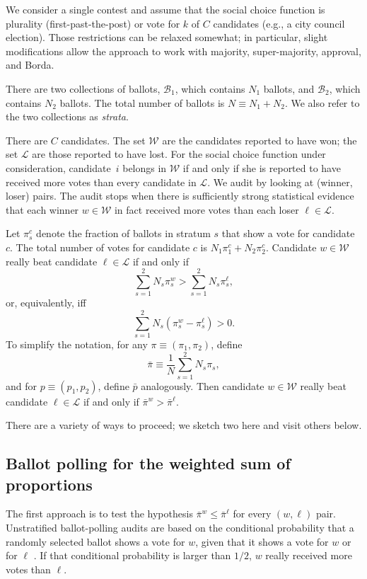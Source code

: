 \documentclass[12pt]{article}
\newcommand{\beq}{\begin{equation}}
\newcommand{\eeq}{\end{equation}}
\newcommand{\mc}[1]{\ensuremath{\mathcal{#1}}}
\newcommand{\bpi}{\bar{\pi}}
\newcommand{\bp}{\bar{p}}
\begin{document}
We consider a single contest and assume that the
social choice function is plurality (first-past-the-post)
or vote for $k$ of $C$ candidates (e.g., a city council election).
Those restrictions can be relaxed somewhat; in particular, slight modifications allow
the approach to work with majority, super-majority, approval, and Borda.

There are two collections of ballots, $\mc{B}_1$, which contains $N_1$ ballots, 
and $\mc{B}_2$, which contains $N_2$ ballots.
The total number of ballots is $N \equiv N_1 + N_2$.
We also refer to the two collections as \emph{strata}.

There are $C$ candidates.
The set $\mc{W}$ are the candidates reported to have won; the set $\mc{L}$ are those
reported to have lost.
For the social choice function under consideration, candidate~$i$ belongs in $\mc{W}$ if and
only if she is reported to have received more votes than every candidate in $\mc{L}$.
We audit by looking at (winner, loser) pairs.
The audit stops when there is sufficiently strong statistical evidence that each winner 
$w \in \mc{W}$ in fact received more votes
than each loser $\ell \in \mc{L}$.

Let $\pi_s^c$ denote the fraction of ballots in stratum $s$ that show a vote for candidate $c$.
The total number of votes for candidate $c$ is $N_1 \pi_1^c + N_2 \pi_2^c$.
Candidate $w \in \mc{W}$ really beat candidate $\ell \in \mc{L}$ if and only if
\beq
    \sum_{s=1}^2 N_s \pi_s^w > \sum_{s=1}^2 N_s \pi_s^\ell,
\eeq
or, equivalently, iff
\beq
    \sum_{s=1}^2 N_s (\pi_s^w-\pi_s^\ell) > 0.
\eeq
To simplify the notation, for any $\pi \equiv (\pi_1, \pi_2)$, define 
\beq
    \bpi \equiv \frac{1}{N}\sum_{s=1}^2 N_s \pi_s,
\eeq
and for $p \equiv (p_1, p_2)$, define $\bp$ analogously.
Then candidate $w \in \mc{W}$ really beat candidate $\ell \in \mc{L}$ if and only if
$\bpi^w > \bpi^\ell$.

There are a variety of ways to proceed; we sketch two here and visit others below.


\subsection{Ballot polling for the weighted sum of proportions}
The first approach is to test the hypothesis 
$\bpi^w \le \bpi^\ell$ for every $(w, \ell)$ pair.
Unstratified ballot-polling audits are based on the conditional 
probability that a randomly selected
ballot shows a vote for $w$, given that it shows a vote for $w$ or for $\ell$
\citep{lindemanStark12,lindemanEtal12}.
If that conditional probability is larger than $1/2$, $w$ really received more votes than
$\ell$.
\end{document}
